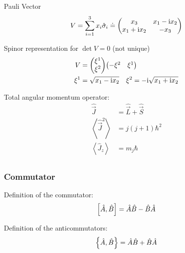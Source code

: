 			\noindent
			Pauli Vector
			\begin{equation}
				V
				= \sum_{i=1}^3 x_i \hat{\sigma}_i
				\doteq \left( \begin{matrix}
						x_3          & x_1 - \mathrm{i} x_2 \\
						x_1 + \mathrm{i} x_2 & - x_3        \\
					\end{matrix} \right)
			\end{equation}

			\noindent
			Spinor representation for $\det V = 0$ (not unique)
			\begin{equation}
				\begin{aligned}
					V &= \mqty(\xi^1\\\xi^2) \mqty(-\xi^2&\xi^1) \\
					\xi^1 &= \sqrt{x_1 - \i x_2} \quad \xi^2 = -\i \sqrt{x_1 + \i x_2} \\
				\end{aligned}
			\end{equation}


			\noindent
			Total angular momentum operator:
			\begin{equation}
				\begin{aligned}
					\hat{\vec{J}} &= \hat{\vec{L}} + \hat{\vec{S}} \\
					\left< \hat{\vec{J}}^2 \right> &= j(j+1)\hbar^2 \\
					\left< \hat{J}_z \right> &= m_j\hbar \\
				\end{aligned}
			\end{equation}

		\subsubsection{Commutator}
			\noindent
			Definition of the commutator:
			\begin{equation}
				\comm{\hat{A}}{\hat{B}} = \hat{A}\hat{B} - \hat{B}\hat{A}
			\end{equation}

			\noindent
			Definition of the anticommutators:
			\begin{equation}
				\acomm{\hat{A}}{\hat{B}} = \hat{A}\hat{B} + \hat{B}\hat{A}
			\end{equation}

